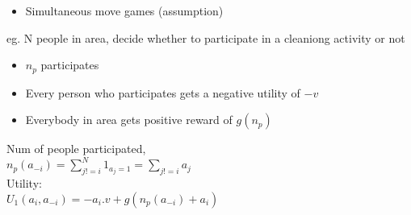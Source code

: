\documentclass{article}
\begin{document}
\begin{itemize}[itemsep=0pt,parsep=0pt,topsep=0pt]
  \item Simultaneous move games (assumption)
\end{itemize}

eg. N people in area, decide whether to participate in a cleaniong activity or not\\


\begin{itemize}[itemsep=0pt,parsep=0pt,topsep=0pt]
  \item $n_p$ participates
  \item Every person who participates gets a negative utility of $-v$
  \item Everybody in area gets positive reward of $g(n_p)$
\end{itemize}
 
Num of people participated, \\
$n_p(a_{-i}) = \sum_{j != i}^{N} 1_{a_j = 1} = \sum_{j!=i} a_j$ \\

Utility:\\
$U_1(a_i, a_{-i}) = -a_i . v + g(n_p(a_{-i}) + a_i)$
\end{document}
